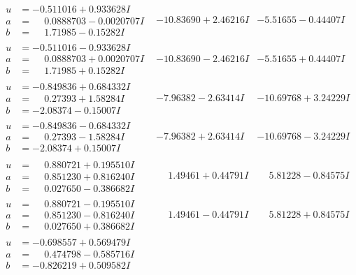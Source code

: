 \documentclass[1p]{elsarticle_modified}
\theoremstyle{definition}
\begin{document}
$$\begin{array}{c|c|c}
\begin{aligned}
u &= -0.511016 + 0.933628 I \\
a &= \phantom{-}0.0888703 - 0.0020707 I \\
b &= \phantom{-}1.71985 - 0.15282 I\end{aligned}
 & -10.83690 + 2.46216 I & -5.51655 - 0.44407 I \\ \hline\begin{aligned}
u &= -0.511016 - 0.933628 I \\
a &= \phantom{-}0.0888703 + 0.0020707 I \\
b &= \phantom{-}1.71985 + 0.15282 I\end{aligned}
 & -10.83690 - 2.46216 I & -5.51655 + 0.44407 I \\ \hline\begin{aligned}
u &= -0.849836 + 0.684332 I \\
a &= \phantom{-}0.27393 + 1.58284 I \\
b &= -2.08374 - 0.15007 I\end{aligned}
 & -7.96382 - 2.63414 I & -10.69768 + 3.24229 I \\ \hline\begin{aligned}
u &= -0.849836 - 0.684332 I \\
a &= \phantom{-}0.27393 - 1.58284 I \\
b &= -2.08374 + 0.15007 I\end{aligned}
 & -7.96382 + 2.63414 I & -10.69768 - 3.24229 I \\ \hline\begin{aligned}
u &= \phantom{-}0.880721 + 0.195510 I \\
a &= \phantom{-}0.851230 + 0.816240 I \\
b &= \phantom{-}0.027650 - 0.386682 I\end{aligned}
 & \phantom{-}1.49461 + 0.44791 I & \phantom{-}5.81228 - 0.84575 I \\ \hline\begin{aligned}
u &= \phantom{-}0.880721 - 0.195510 I \\
a &= \phantom{-}0.851230 - 0.816240 I \\
b &= \phantom{-}0.027650 + 0.386682 I\end{aligned}
 & \phantom{-}1.49461 - 0.44791 I & \phantom{-}5.81228 + 0.84575 I \\ \hline\begin{aligned}
u &= -0.698557 + 0.569479 I \\
a &= \phantom{-}0.474798 - 0.585716 I \\
b &= -0.826219 + 0.509582 I\end{aligned}

\end{array}$$
\end{document}
